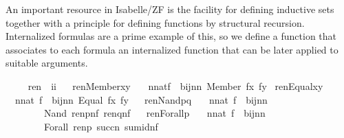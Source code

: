 An important resource in Isabelle/ZF is the facility for defining
inductive sets \cite{paulson2000fixedpoint,paulson1995set} together
with a principle for defining functions by structural recursion.
Internalized formulas are a prime example of this, so we define
a function  that associates to each formula an internalized
function that can be later applied to suitable arguments.
\begin{isabelle}
  \ \isamarkupfalse%
\ \ \ ren\ {\isacharcolon}{\isacharcolon}\ {\isachardoublequoteopen}i{\isacharequal}{\isachargreater}i{\isachardoublequoteclose}\isanewline
\ \isamarkupfalse%
\isanewline
\ {\isachardoublequoteopen}ren{\isacharparenleft}Member{\isacharparenleft}x{\isacharcomma}y{\isacharparenright}{\isacharparenright}\ {\isacharequal}\isanewline
\ \ {\isacharparenleft}{\isasymlambda}n{\isasymin}nat{\isachardot}{\isasymlambda}f\ {\isasymin}\ bij{\isacharparenleft}n{\isacharcomma}n{\isacharparenright}{\isachardot}\ Member\ {\isacharparenleft}f{\isacharbackquote}x{\isacharcomma}\ f{\isacharbackquote}y{\isacharparenright}{\isacharparenright}{\isachardoublequoteclose}\isanewline
\ {\isachardoublequoteopen}ren{\isacharparenleft}Equal{\isacharparenleft}x{\isacharcomma}y{\isacharparenright}{\isacharparenright}\ {\isacharequal}\isanewline
\ \ {\isacharparenleft}{\isasymlambda}n{\isasymin}nat{\isachardot}\ {\isasymlambda}f\ {\isasymin}\ bij{\isacharparenleft}n{\isacharcomma}n{\isacharparenright}{\isachardot}\ Equal\ {\isacharparenleft}f{\isacharbackquote}x{\isacharcomma}\ f{\isacharbackquote}y{\isacharparenright}{\isacharparenright}{\isachardoublequoteclose}\isanewline
\ \isanewline
\ {\isachardoublequoteopen}ren{\isacharparenleft}Nand{\isacharparenleft}p{\isacharcomma}q{\isacharparenright}{\isacharparenright}\ {\isacharequal}\isanewline
\ \ {\isacharparenleft}{\isasymlambda}n{\isasymin}nat{\isachardot}\ {\isasymlambda}f\ {\isasymin}\ bij{\isacharparenleft}n{\isacharcomma}n{\isacharparenright}{\isachardot}\isanewline
\ \ \ \ \ \ \ \ Nand\ {\isacharparenleft}ren{\isacharparenleft}p{\isacharparenright}{\isacharbackquote}n{\isacharbackquote}f{\isacharcomma}\ ren{\isacharparenleft}q{\isacharparenright}{\isacharbackquote}n{\isacharbackquote}f{\isacharparenright}{\isacharparenright}{\isachardoublequoteclose}\isanewline
\ \isanewline
\ {\isachardoublequoteopen}ren{\isacharparenleft}Forall{\isacharparenleft}p{\isacharparenright}{\isacharparenright}\ {\isacharequal}\isanewline
\ \ {\isacharparenleft}{\isasymlambda}n{\isasymin}nat{\isachardot}\ {\isasymlambda}f\ {\isasymin}\ bij{\isacharparenleft}n{\isacharcomma}n{\isacharparenright}{\isachardot}\isanewline
\ \ \ \ \ \ \ \ Forall\ {\isacharparenleft}ren{\isacharparenleft}p{\isacharparenright}\ {\isacharbackquote}succ{\isacharparenleft}n{\isacharparenright}{\isacharbackquote}\ sum{\isacharunderscore}id{\isacharparenleft}n{\isacharcomma}f{\isacharparenright}{\isacharparenright}{\isacharparenright}{\isachardoublequoteclose}
\end{isabelle}

